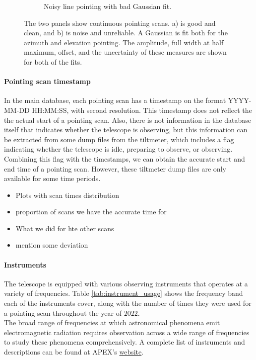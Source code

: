 \begin{figure}[H]
\begin{subfigure}[b]{0.75\textwidth}
         \caption{Noisy line pointing with bad Gaussian fit.}
         \label{subfig:bad_continuous}
     \end{subfigure}
    \caption{The two panels show continuous pointing scans. a) is good and clean, and b) is noise and unreliable. A Gaussian is fit both for the azimuth and elevation pointing. The amplitude, full width at half maximum, offset, and the uncertainty of these measures are shown for both of the fits.}
    \label{fig:continueous_pointings}
\end{figure}



\paragraph{Pointing scan timestamp} 
In the main database, each pointing scan has a timestamp on the format YYYY-MM-DD HH:MM:SS, with second resolution. This timestamp does not reflect the the actual start of a pointing scan. Also, there is not information in the database itself that indicates whether the telescope is observing, but this information can be extracted from some dump files from the tiltmeter, which includes a flag indicating whether the telescope is idle, preparing to observe, or observing. Combining this flag with the timestamps, we can obtain the accurate start and end time of a pointing scan. However, these tiltmeter dump files are only available for some time periods.

\begin{itemize}
    \item Plots with scan times distribution
    \item proportion of scans we have the accurate time for
    \item What we did for hte other scans
    \item mention some deviation
\end{itemize}

\paragraph{Instruments}
The telescope is equipped with various observing instruments that operates at a variety of frequencies.
Table \ref{tab:instrument_usage} shows the frequency band each of the instruments cover,
along with the number of times they were used for a pointing scan throughout the year of $2022$.\\

The broad range of frequencies at which astronomical phenomena emit electromagnetic radiation requires observation across a wide range of frequencies to study these phenomena comprehensively.
A complete list of instruments and descriptions can be found at APEX's \href{https://www.eso.org/sci/facilities/apex/cfp/cfp110/instrument_summary.html.html}{website}.

